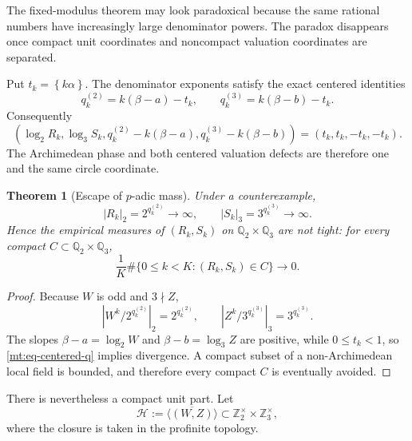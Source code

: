 \documentclass[11pt,oneside]{article}
\newtheorem{theorem}{Theorem}[section]
\theoremstyle{definition}
\theoremstyle{remark}
\newcommand{\Z}{\mathbb Z}
\newcommand{\Q}{\mathbb Q}
\newcommand{\fract}[1]{\left\{#1\right\}}
\begin{document}
The fixed-modulus theorem may look paradoxical because the same rational numbers have
increasingly large denominator powers.  The paradox disappears once compact unit coordinates
and noncompact valuation coordinates are separated.

Put $t_k=\fract{k\alpha}$.  The denominator exponents satisfy the exact centered identities
\begin{equation}
 q^{(2)}_k=k(\beta-a)-t_k,
 \qquad
 q^{(3)}_k=k(\beta-b)-t_k.
 \label{mt:eq-centered-q}
\end{equation}
Consequently
\begin{equation}
 \left(
  \log_2R_k,\log_3S_k,
  q^{(2)}_k-k(\beta-a),
  q^{(3)}_k-k(\beta-b)
 \right)
 =(t_k,t_k,-t_k,-t_k).
 \label{mt:eq-centered-fourfold}
\end{equation}
The Archimedean phase and both centered valuation defects are therefore one and the same
circle coordinate.

\begin{theorem}[Escape of $p$-adic mass]
\label{mt:thm-padic-escape}
Under a counterexample,
\begin{equation}
 |R_k|_2=2^{q^{(2)}_k}\longrightarrow\infty,
 \qquad
 |S_k|_3=3^{q^{(3)}_k}\longrightarrow\infty.
 \label{mt:eq-padic-escape}
\end{equation}
Hence the empirical measures of $(R_k,S_k)$ on $\Q_2\times\Q_3$ are not tight: for every
compact $C\subset\Q_2\times\Q_3$,
\begin{equation}
 \frac1K\#\{0\le k<K:(R_k,S_k)\in C\}\longrightarrow0.
 \label{mt:eq-escape-compact}
\end{equation}
\end{theorem}

\begin{proof}
Because $W$ is odd and $3\nmid Z$,
\[
 |W^k/2^{q^{(2)}_k}|_2=2^{q^{(2)}_k},
 \qquad
 |Z^k/3^{q^{(3)}_k}|_3=3^{q^{(3)}_k}.
\]
The slopes $\beta-a=\log_2W$ and $\beta-b=\log_3Z$ are positive, while $0\le t_k<1$, so
\eqref{mt:eq-centered-q} implies divergence.  A compact subset of a non-Archimedean local
field is bounded, and therefore every compact $C$ is eventually avoided.
\end{proof}

There is nevertheless a compact unit part.  Let
\begin{equation}
 \mathcal H:=\overline{\langle(W,Z)\rangle}
 \subset\Z_2^\times\times\Z_3^\times,
 \label{mt:eq-unit-H}
\end{equation}
where the closure is taken in the profinite topology.
\end{document}
